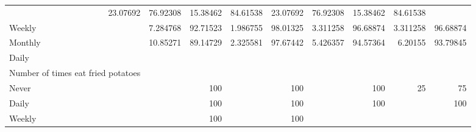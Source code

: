\documentclass{article}
\begin{document}
\begin{tabular}{lllllllll}
  \multicolumn{1}{|r}{23.07692} &
  \multicolumn{1}{r}{76.92308} &
  \multicolumn{1}{r}{15.38462} &
  \multicolumn{1}{r}{84.61538} &
  \multicolumn{1}{r}{23.07692} &
  \multicolumn{1}{r}{76.92308} &
  \multicolumn{1}{r}{15.38462} &
  \multicolumn{1}{r}{84.61538} \\
\multicolumn{1}{l}{\hspace{7em}Weekly} &
  \multicolumn{1}{|r}{7.284768} &
  \multicolumn{1}{r}{92.71523} &
  \multicolumn{1}{r}{1.986755} &
  \multicolumn{1}{r}{98.01325} &
  \multicolumn{1}{r}{3.311258} &
  \multicolumn{1}{r}{96.68874} &
  \multicolumn{1}{r}{3.311258} &
  \multicolumn{1}{r}{96.68874} \\
\multicolumn{1}{l}{\hspace{7em}Monthly} &
  \multicolumn{1}{|r}{10.85271} &
  \multicolumn{1}{r}{89.14729} &
  \multicolumn{1}{r}{2.325581} &
  \multicolumn{1}{r}{97.67442} &
  \multicolumn{1}{r}{5.426357} &
  \multicolumn{1}{r}{94.57364} &
  \multicolumn{1}{r}{6.20155} &
  \multicolumn{1}{r}{93.79845} \\
\multicolumn{1}{l}{\hspace{5em}Daily} &
  \multicolumn{1}{|r}{} &
  \multicolumn{1}{r}{} &
  \multicolumn{1}{r}{} &
  \multicolumn{1}{r}{} &
  \multicolumn{1}{r}{} &
  \multicolumn{1}{r}{} &
  \multicolumn{1}{r}{} &
  \multicolumn{1}{r}{} \\
\multicolumn{1}{l}{\hspace{6em}Number of times eat fried potatoes} &
  \multicolumn{1}{|r}{} &
  \multicolumn{1}{r}{} &
  \multicolumn{1}{r}{} &
  \multicolumn{1}{r}{} &
  \multicolumn{1}{r}{} &
  \multicolumn{1}{r}{} &
  \multicolumn{1}{r}{} &
  \multicolumn{1}{r}{} \\
\multicolumn{1}{l}{\hspace{7em}Never} &
  \multicolumn{1}{|r}{} &
  \multicolumn{1}{r}{100} &
  \multicolumn{1}{r}{} &
  \multicolumn{1}{r}{100} &
  \multicolumn{1}{r}{} &
  \multicolumn{1}{r}{100} &
  \multicolumn{1}{r}{25} &
  \multicolumn{1}{r}{75} \\
\multicolumn{1}{l}{\hspace{7em}Daily} &
  \multicolumn{1}{|r}{} &
  \multicolumn{1}{r}{100} &
  \multicolumn{1}{r}{} &
  \multicolumn{1}{r}{100} &
  \multicolumn{1}{r}{} &
  \multicolumn{1}{r}{100} &
  \multicolumn{1}{r}{} &
  \multicolumn{1}{r}{100} \\
\multicolumn{1}{l}{\hspace{7em}Weekly} &
  \multicolumn{1}{|r}{} &
  \multicolumn{1}{r}{100} &
  \multicolumn{1}{r}{} &
  \multicolumn{1}{r}{100} &

\end{tabular}
\end{document}
